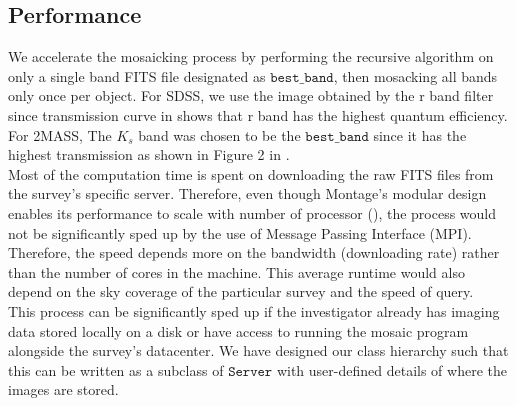 \documentclass[5p]{elsarticle}
\begin{document}
	\subsection{Performance}	
	\indent We accelerate the mosaicking process by performing the recursive algorithm on only a single band FITS file designated as $\texttt{best\_band}$, then mosacking all bands only once per object. For SDSS, we use the image obtained by the r band filter since transmission curve in \citet{edr} shows that r band has the highest quantum efficiency. For 2MASS, The $K_s$ band was chosen to be the $\texttt{best\_band}$ since it has the highest transmission as shown  in Figure 2 in \citet{2mass}.
	\\
	 \indent  Most of the computation time is spent on downloading the raw FITS files from the survey's specific server. Therefore, even though Montage's modular design enables its performance to scale with number of processor  (\citet{montage}), the process would not be significantly sped up by the use of Message Passing Interface (MPI). Therefore, the speed depends more on the bandwidth (downloading rate) rather than the number of cores in the machine. This average runtime would also depend on the sky coverage of the  particular survey and the speed of query.
	\\ \indent This process can  be significantly sped up if the investigator already has imaging data stored locally on a disk or have access to running the mosaic program alongside the survey's datacenter. We have designed our class hierarchy such that this can be written as a subclass of $\texttt{Server}$ with user-defined details of where the images are stored.
\end{document}
